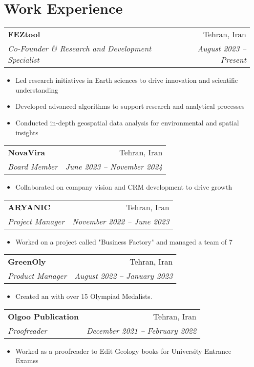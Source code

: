 \documentclass[letterpaper,11pt]{article}
\makeatletter
\newcommand{\resitem}[1]{\item #1 \vspace{-2pt}}
\newcommand{\ressubheading}[4]{%
	\begin{tabular*}{6.5in}{l@{\cftdotfill{\cftsecdotsep}\extracolsep{\fill}}r}
		\textbf{#1} & #2 \\
		\textit{#3} & \textit{#4} \\
	\end{tabular*}\vspace{-8pt}
}
\makeatother
\begin{document}
	\section{Work Experience}
	\vspace{-0.78em} 
	\ressubheading{FEZtool}{Tehran, Iran}{Co-Founder \& Research and Development Specialist}{August 2023 – Present}
	\begin{itemize}[topsep=7.5pt,partopsep=0pt,itemsep=3.5pt,parsep=0pt]
		\resitem{Led research initiatives in Earth sciences to drive innovation and scientific understanding}
		\resitem{Developed advanced algorithms to support research and analytical processes}
		\resitem{Conducted in-depth geospatial data analysis for environmental and spatial insights}
	\end{itemize}
	\vspace{-0.50em} 
	\ressubheading{NovaVira}{Tehran, Iran}{Board Member}{June 2023 – November 2024}
	\begin{itemize}[topsep=7.5pt,partopsep=0pt,itemsep=3.5pt,parsep=0pt]
		\resitem{Collaborated on company vision and CRM development to drive growth}
	\end{itemize}
	\vspace{-0.50em} 
	\ressubheading{ARYANIC}{Tehran, Iran}{Project Manager}{November 2022 – June 2023}
	\begin{itemize}[topsep=7.5pt,partopsep=0pt,itemsep=3.5pt,parsep=0pt]
		\resitem{Worked on a project called "Business Factory" and managed a team of 7}
	\end{itemize}
	\vspace{-0.50em} 
	\ressubheading{GreenOly}{Tehran, Iran}{Product Manager}{August 2022 – January 2023}
	\begin{itemize}[topsep=7.5pt,partopsep=0pt,itemsep=3.5pt,parsep=0pt]
		\resitem{Created an
		\href{https://aradfarahani.com/MOOC/}{\dotuline{Entrepreneurship MOOC}} with over 15 Olympiad Medalists.}
	\end{itemize}
	\vspace{-0.50em}
	\ressubheading{Olgoo Publication }{Tehran, Iran}{Proofreader}{December 2021 – February 2022}
	\begin{itemize}[topsep=7.5pt,partopsep=0pt,itemsep=3.5pt,parsep=0pt]
		\resitem{Worked as a proofreader to Edit Geology books for University Entrance Examss}
	\end{itemize}
\end{document}
